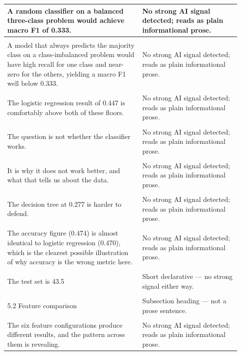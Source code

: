 \documentclass[11pt]{article}
\begin{document}
\begin{longtable}{|p{0.55\linewidth}|p{0.40\linewidth}|}
\hline
A random classifier on a balanced three-class problem would achieve macro F1 of 0.333. & No strong AI signal detected; reads as plain informational prose. \\[2pt]
\hline
\rule{0pt}{3.5cm} & \\
\hline
A model that always predicts the majority class on a class-imbalanced problem would have high recall for one class and near-zero for the others, yielding a macro F1 well below 0.333. & No strong AI signal detected; reads as plain informational prose. \\[2pt]
\hline
\rule{0pt}{3.5cm} & \\
\hline
The logistic regression result of 0.447 is comfortably above both of these floors. & No strong AI signal detected; reads as plain informational prose. \\[2pt]
\hline
\rule{0pt}{3.5cm} & \\
\hline
The question is not whether the classifier works. & No strong AI signal detected; reads as plain informational prose. \\[2pt]
\hline
\rule{0pt}{3.5cm} & \\
\hline
It is why it does not work better, and what that tells us about the data. & No strong AI signal detected; reads as plain informational prose. \\[2pt]
\hline
\rule{0pt}{3.5cm} & \\
\hline
The decision tree at 0.277 is harder to defend. & No strong AI signal detected; reads as plain informational prose. \\[2pt]
\hline
\rule{0pt}{3.5cm} & \\
\hline
The accuracy figure (0.474) is almost identical to logistic regression (0.470), which is the clearest possible illustration of why accuracy is the wrong metric here. & No strong AI signal detected; reads as plain informational prose. \\[2pt]
\hline
\rule{0pt}{3.5cm} & \\
\hline
The test set is 43.5 & Short declarative --- no strong signal either way. \\[2pt]
\hline
\rule{0pt}{3.5cm} & \\
\hline
5.2 Feature comparison & Subsection heading --- not a prose sentence. \\[2pt]
\hline
\rule{0pt}{3.5cm} & \\
\hline
The six feature configurations produce different results, and the pattern across them is revealing. & No strong AI signal detected; reads as plain informational prose. \\[2pt]

\end{longtable}
\end{document}
